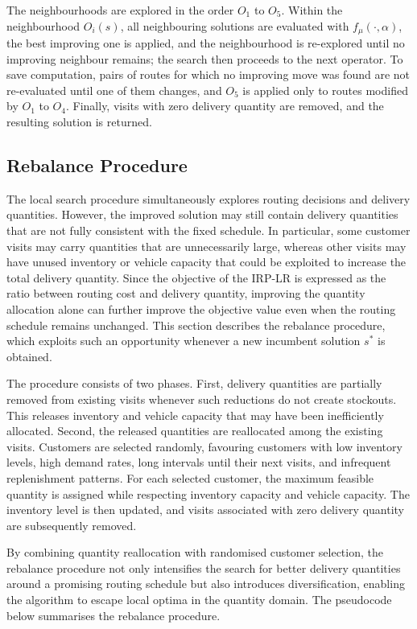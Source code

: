 \documentclass{article}
\begin{document}
The neighbourhoods are explored in the order $O_1$ to $O_5$. Within the neighbourhood $O_i(s)$, all neighbouring solutions are evaluated with $f_{\mu}(\cdot,\alpha)$, the best improving one is applied, and the neighbourhood is re-explored until no improving neighbour remains; the search then proceeds to the next operator. To save computation, pairs of routes for which no improving move was found are not re-evaluated until one of them changes, and $O_5$ is applied only to routes modified by $O_1$ to $O_4$. Finally, visits with zero delivery quantity are removed, and the resulting solution is returned.



\subsection{Rebalance Procedure} \label{sec:rebalance}

The local search procedure simultaneously explores routing decisions and delivery quantities. However, the improved solution may still contain delivery quantities that are not fully consistent with the fixed schedule. In particular, some customer visits may carry quantities that are unnecessarily large, whereas other visits may have unused inventory or vehicle capacity that could be exploited to increase the total delivery quantity. Since the objective of the IRP-LR is expressed as the ratio between routing cost and delivery quantity, improving the quantity allocation alone can further improve the objective value even when the routing schedule remains unchanged. This section describes the rebalance procedure, which exploits such an opportunity whenever a new incumbent solution $s^*$ is obtained. 

The procedure consists of two phases. First, delivery quantities are partially removed from existing visits whenever such reductions do not create stockouts. This releases inventory and vehicle capacity that may have been inefficiently allocated. Second, the released quantities are reallocated among the existing visits. Customers are selected randomly, favouring customers with low inventory levels, high demand rates, long intervals until their next visits, and infrequent replenishment patterns. For each selected customer, the maximum feasible quantity is assigned while respecting inventory capacity and vehicle capacity. The inventory level is then updated, and visits associated with zero delivery quantity are subsequently removed.

By combining quantity reallocation with randomised customer selection, the rebalance procedure not only intensifies the search for better delivery quantities around a promising routing schedule but also introduces diversification, enabling the algorithm to escape local optima in the quantity domain. The pseudocode below summarises the rebalance procedure.
\end{document}
